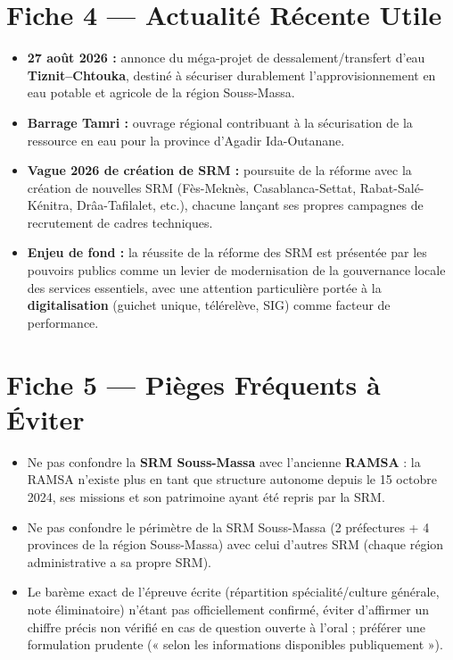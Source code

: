 \section{Fiche 4 --- Actualité Récente Utile}
\begin{itemize}
    \item \textbf{27 août 2026 :} annonce du méga-projet de dessalement/transfert d'eau \textbf{Tiznit--Chtouka}, destiné à sécuriser durablement l'approvisionnement en eau potable et agricole de la région Souss-Massa.
    \item \textbf{Barrage Tamri :} ouvrage régional contribuant à la sécurisation de la ressource en eau pour la province d'Agadir Ida-Outanane.
    \item \textbf{Vague 2026 de création de SRM :} poursuite de la réforme avec la création de nouvelles SRM (Fès-Meknès, Casablanca-Settat, Rabat-Salé-Kénitra, Drâa-Tafilalet, etc.), chacune lançant ses propres campagnes de recrutement de cadres techniques.
    \item \textbf{Enjeu de fond :} la réussite de la réforme des SRM est présentée par les pouvoirs publics comme un levier de modernisation de la gouvernance locale des services essentiels, avec une attention particulière portée à la \textbf{digitalisation} (guichet unique, télérelève, SIG) comme facteur de performance.
\end{itemize}

\section{Fiche 5 --- Pièges Fréquents à Éviter}
\begin{itemize}
    \item Ne pas confondre la \textbf{SRM Souss-Massa} avec l'ancienne \textbf{RAMSA} : la RAMSA n'existe plus en tant que structure autonome depuis le 15 octobre 2024, ses missions et son patrimoine ayant été repris par la SRM.
    \item Ne pas confondre le périmètre de la SRM Souss-Massa (2 préfectures + 4 provinces de la région Souss-Massa) avec celui d'autres SRM (chaque région administrative a sa propre SRM).
    \item Le barème exact de l'épreuve écrite (répartition spécialité/culture générale, note éliminatoire) n'étant pas officiellement confirmé, éviter d'affirmer un chiffre précis non vérifié en cas de question ouverte à l'oral ; préférer une formulation prudente (« selon les informations disponibles publiquement »).
\end{itemize}
